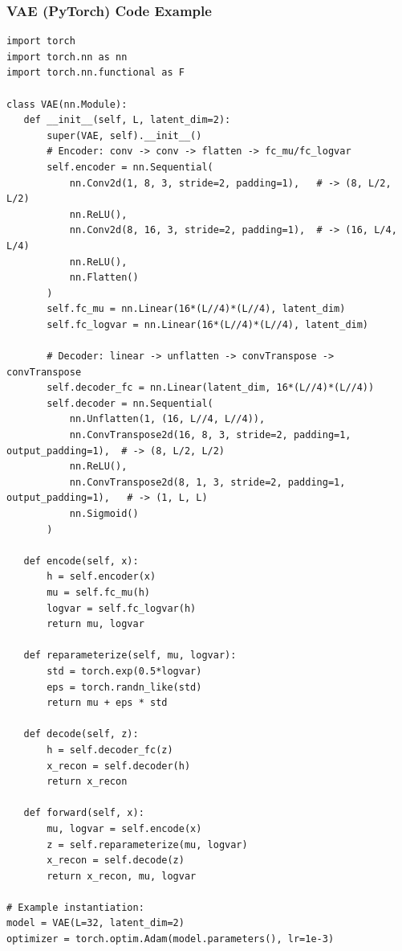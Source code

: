 \documentclass{beamer}
\begin{document}
\begin{frame}
\frametitle{VAE (PyTorch) Code Example}

\begin{verbatim}
import torch
import torch.nn as nn
import torch.nn.functional as F

class VAE(nn.Module):
   def __init__(self, L, latent_dim=2):
       super(VAE, self).__init__()
       # Encoder: conv -> conv -> flatten -> fc_mu/fc_logvar
       self.encoder = nn.Sequential(
           nn.Conv2d(1, 8, 3, stride=2, padding=1),   # -> (8, L/2, L/2)
           nn.ReLU(),
           nn.Conv2d(8, 16, 3, stride=2, padding=1),  # -> (16, L/4, L/4)
           nn.ReLU(),
           nn.Flatten()
       )
       self.fc_mu = nn.Linear(16*(L//4)*(L//4), latent_dim)
       self.fc_logvar = nn.Linear(16*(L//4)*(L//4), latent_dim)

       # Decoder: linear -> unflatten -> convTranspose -> convTranspose
       self.decoder_fc = nn.Linear(latent_dim, 16*(L//4)*(L//4))
       self.decoder = nn.Sequential(
           nn.Unflatten(1, (16, L//4, L//4)),
           nn.ConvTranspose2d(16, 8, 3, stride=2, padding=1, output_padding=1),  # -> (8, L/2, L/2)
           nn.ReLU(),
           nn.ConvTranspose2d(8, 1, 3, stride=2, padding=1, output_padding=1),   # -> (1, L, L)
           nn.Sigmoid()
       )

   def encode(self, x):
       h = self.encoder(x)
       mu = self.fc_mu(h)
       logvar = self.fc_logvar(h)
       return mu, logvar

   def reparameterize(self, mu, logvar):
       std = torch.exp(0.5*logvar)
       eps = torch.randn_like(std)
       return mu + eps * std

   def decode(self, z):
       h = self.decoder_fc(z)
       x_recon = self.decoder(h)
       return x_recon

   def forward(self, x):
       mu, logvar = self.encode(x)
       z = self.reparameterize(mu, logvar)
       x_recon = self.decode(z)
       return x_recon, mu, logvar

# Example instantiation:
model = VAE(L=32, latent_dim=2)
optimizer = torch.optim.Adam(model.parameters(), lr=1e-3)

\end{verbatim}
\end{frame}
\end{document}

